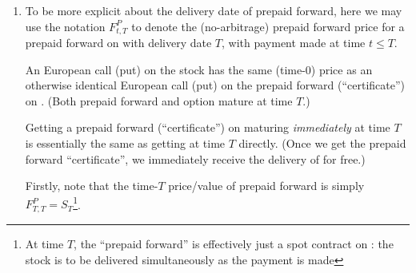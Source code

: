 \begin{enumerate}
\item To be more explicit about the delivery date of prepaid forward, here we
may use the notation \(F_{t,T}^P\) to denote the (no-arbitrage) prepaid
forward price for a prepaid forward on  with delivery date
\(T\), with payment made at time \(t\le T\).

\begin{proposition}
\label{prp:call-put-on-ppf-stock-same}
An European call (put) on the stock  has the same (time-0)
price as an otherwise identical European call (put) on the prepaid forward
(``certificate'')  on . (Both prepaid forward
and option mature at time \(T\).)
\end{proposition}
\begin{intuition}
Getting a prepaid forward (``certificate'')  on
 maturing \emph{immediately} at time \(T\) is essentially the
same as getting  at time \(T\) directly. (Once we get the
prepaid forward ``certificate'', we immediately receive the delivery of
 for free.)
\end{intuition}

\begin{pf}
Firstly, note that the time-\(T\) price/value of prepaid forward is simply
\(F_{T,T}^{P}=S_T\)\footnote{At time \(T\), the ``prepaid forward'' is effectively
just a spot contract on : the stock  is to
be delivered simultaneously as the payment is made}.


\end{pf}
\end{enumerate}
